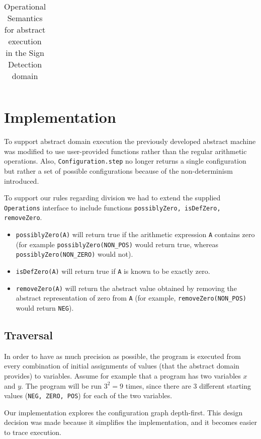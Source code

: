 \documentclass[a4paper,11pt]{article}
\begin{document}
\begin{table}[h!]
\begin{tabular}{|llll|}
\hline
\end{tabular}
\caption{Operational Semantics for abstract execution in the Sign Detection domain}
\label{table:am_rules}
\end{table}

\section{Implementation}
To support abstract domain execution the previously developed abstract machine was modified to use user-provided functions rather than
the regular arithmetic operations.
Also, \verb|Configuration.step| no longer returns a single configuration but rather a set of possible configurations because of the non-determinism introduced.

To support our rules regarding division we had to extend the supplied \verb|Operations| interface to include functions \verb|possiblyZero, isDefZero, removeZero|.
\begin{itemize}
\item
\verb|possiblyZero(A)| will return true if the arithmetic expression \verb|A| contains zero (for example \verb|possiblyZero(NON_POS)| would return true,
whereas \verb|possiblyZero(NON_ZERO)| would not).

\item
\verb|isDefZero(A)| will return true if \verb|A| is known to be exactly zero.

\item
\verb|removeZero(A)| will return the abstract value obtained by removing the abstract representation of zero from \verb|A| (for example, \verb|removeZero(NON_POS)| would return \verb|NEG|).

\end{itemize}

\subsection{Traversal}
In order to have as much precision as possible, the program is executed from every combination
of initial assignments of values (that the abstract domain provides) to variables.
Assume for example that a program has two variables $x$ and $y$.
The program will be run $3^2 = 9$ times, since there are $3$ different starting values (\verb|NEG, ZERO, POS|) for
each of the two variables.

Our implementation explores the configuration graph depth-first.
This design decision was made because it simplifies the implementation, and it becomes easier to trace execution.
\end{document}

